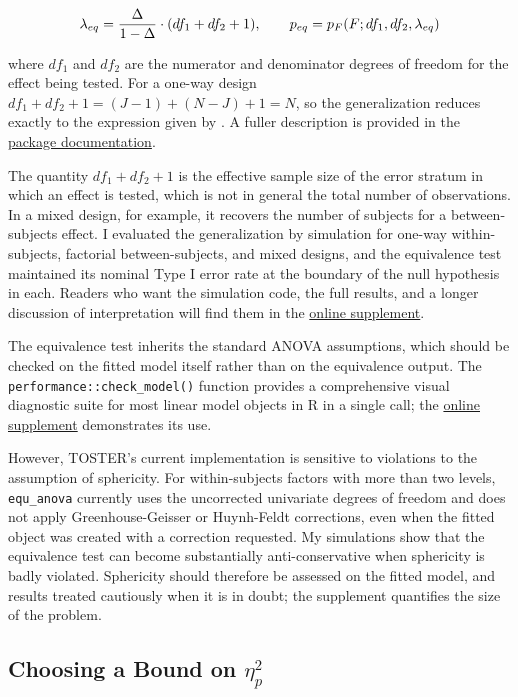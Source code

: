 \documentclass[]{interact}
\theoremstyle{plain}%
\theoremstyle{definition}
\theoremstyle{remark}
\begin{document}
\[
\lambda_{eq} = \frac{\Delta}{1 - \Delta} \cdot (df_1 + df_2 + 1), \qquad p_{eq} = p_F(F; \space df_1, \space df_2, \space \lambda_{eq})
\]

where \(df_1\) and \(df_2\) are the numerator and denominator degrees of
freedom for the effect being tested. For a one-way design
\(df_1 + df_2 + 1 = (J-1) + (N-J) + 1 = N\), so the generalization
reduces exactly to the expression given by \citet{Campbell_2021}. A
fuller description is provided in the
\href{https://aaroncaldwell.us/TOSTERpkg/articles/the_ftestTOSTER.html}{package
documentation}.

The quantity \(df_1 + df_2 + 1\) is the effective sample size of the
error stratum in which an effect is tested, which is not in general the
total number of observations. In a mixed design, for example, it
recovers the number of subjects for a between-subjects effect. I
evaluated the generalization by simulation for one-way within-subjects,
factorial between-subjects, and mixed designs, and the equivalence test
maintained its nominal Type I error rate at the boundary of the null
hypothesis in each. Readers who want the simulation code, the full
results, and a longer discussion of interpretation will find them in the
\href{https://doi.org/10.5281/zenodo.22776188}{online supplement}.

The equivalence test inherits the standard ANOVA assumptions, which
should be checked on the fitted model itself rather than on the
equivalence output. The \texttt{performance::check\_model()} function
provides a comprehensive visual diagnostic suite for most linear model
objects in R in a single call; the
\href{https://doi.org/10.5281/zenodo.22776189}{online supplement}
demonstrates its use.

However, TOSTER's current implementation is sensitive to violations to
the assumption of sphericity. For within-subjects factors with more than
two levels, \texttt{equ\_anova} currently uses the uncorrected
univariate degrees of freedom and does not apply Greenhouse-Geisser or
Huynh-Feldt corrections, even when the fitted object was created with a
correction requested. My simulations show that the equivalence test can
become substantially anti-conservative when sphericity is badly
violated. Sphericity should therefore be assessed on the fitted model,
and results treated cautiously when it is in doubt; the supplement
quantifies the size of the problem.

\subsection{\texorpdfstring{Choosing a Bound on
\(\eta^2_p\)}{Choosing a Bound on \textbackslash eta\^{}2\_p}}\label{choosing-a-bound-on-eta2_p}
\end{document}
